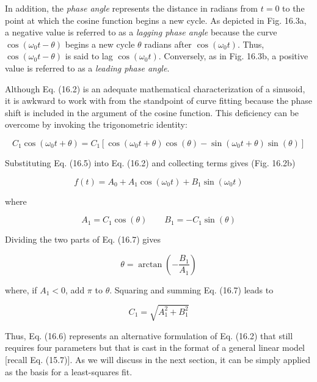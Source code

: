 \documentclass[../main.tex]{subfiles}
\begin{document}
In addition, the \textit{phase angle} represents the distance in radians from $t = 0$ to the point at which the cosine function begins a new cycle. As depicted in Fig. 16.3a, a negative value is referred to as a \textit{lagging phase angle} because the curve $\cos(\omega_0 t - \theta)$ begins a new cycle $\theta$ radians after $\cos(\omega_0 t)$. Thus, $\cos(\omega_0 t - \theta)$ is said to lag $\cos(\omega_0 t)$. Conversely, as in Fig. 16.3b, a positive value is referred to as a \textit{leading phase angle}.

Although Eq. (16.2) is an adequate mathematical characterization of a sinusoid, it is awkward to work with from the standpoint of curve fitting because the phase shift is included in the argument of the cosine function. This deficiency can be overcome by invoking the trigonometric identity:

\begin{equation}
	\tag{16.5}
	C_1 \cos(\omega_0 t + \theta) = C_1 [\cos(\omega_0 t + \theta) \cos(\theta) - \sin(\omega_0 t + \theta) \sin(\theta)]
\end{equation}

\noindent Substituting Eq. (16.5) into Eq. (16.2) and collecting terms gives (Fig. 16.2b)

\begin{equation}
	\tag{16.6}
	f(t) = A_0 + A_1 \cos(\omega_0 t) + B_1 \sin(\omega_0 t)
\end{equation}

\noindent where

\begin{equation}
	\tag{16.7}
	A_1 = C_1 \cos(\theta) \quad \quad B_1 = - C_1 \sin(\theta)
\end{equation}

\noindent Dividing the two parts of Eq. (16.7) gives

\begin{equation}
	\tag{16.8}
	\theta = \arctan (- \frac{B_1}{A_1})
\end{equation}

\noindent where, if $A_1 < 0$, add $\pi$ to $\theta$. Squaring and summing Eq. (16.7) leads to

\begin{equation}
	\tag{16.9}
	C_1 = \sqrt{A^2_1 + B ^2_1}
\end{equation}

\noindent Thus, Eq. (16.6) represents an alternative formulation of Eq. (16.2) that still requires four parameters but that is cast in the format of a general linear model [recall Eq. (15.7)]. As we will
discuss in the next section, it can be simply applied as the basis for a least-squares fit.
\end{document}
